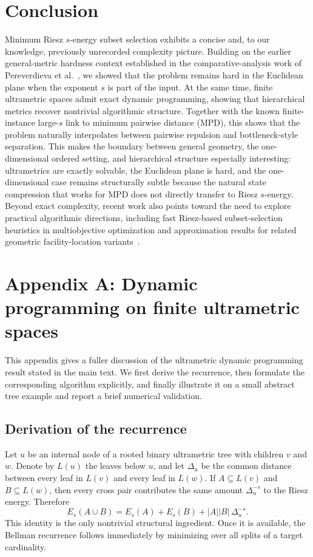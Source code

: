 \documentclass[11pt]{article}
\begin{document}
\section{Conclusion}
Minimum Riesz $s$-energy subset selection exhibits a concise and, to our
knowledge, previously unrecorded complexity picture. Building on the earlier
general-metric hardness context established in the comparative-analysis work of
Pereverdieva et al.~\cite{PereverdievaEtAl2025}, we showed that the problem
remains hard in the Euclidean plane when the exponent $s$ is part of the input.
At the same time, finite ultrametric spaces admit exact dynamic programming,
showing that hierarchical metrics recover nontrivial algorithmic structure.
Together with the known finite-instance large-$s$ link to minimum pairwise distance (MPD),
this shows that the problem naturally interpolates between pairwise repulsion
and bottleneck-style separation. This makes the boundary between general
geometry, the one-dimensional ordered setting, and hierarchical structure
especially interesting: ultrametrics are exactly solvable, the Euclidean plane
is hard, and the one-dimensional case remains structurally subtle because the
natural state compression that works for MPD does not directly transfer to
Riesz $s$-energy. Beyond exact complexity, recent work also points toward the need to explore practical
algorithmic directions, including fast Riesz-based subset-selection heuristics
in multiobjective optimization and approximation results for related geometric
facility-location variants~\cite{FalconCardonaEtAl2025,Emmerich2025,Atta2026}.

\appendix

\section{Appendix A: Dynamic programming on finite ultrametric spaces}\label{app:ultra}

This appendix gives a fuller discussion of the ultrametric dynamic programming result stated in the main text. We first derive the recurrence, then formulate the corresponding algorithm explicitly, and finally illustrate it on a small abstract tree example and report a brief numerical validation.

\subsection{Derivation of the recurrence}

Let $u$ be an internal node of a rooted binary ultrametric tree with children $v$ and $w$. Denote by $L(u)$ the leaves below $u$, and let $\Delta_u$ be the common distance between every leaf in $L(v)$ and every leaf in $L(w)$. If $A\subseteq L(v)$ and $B\subseteq L(w)$, then every cross pair contributes the same amount $\Delta_u^{-s}$ to the Riesz energy. Therefore
\[
E_s(A\cup B)=E_s(A)+E_s(B)+|A||B|\,\Delta_u^{-s}.
\]
This identity is the only nontrivial structural ingredient. Once it is available, the Bellman recurrence follows immediately by minimizing over all splits of a target cardinality.
\end{document}
